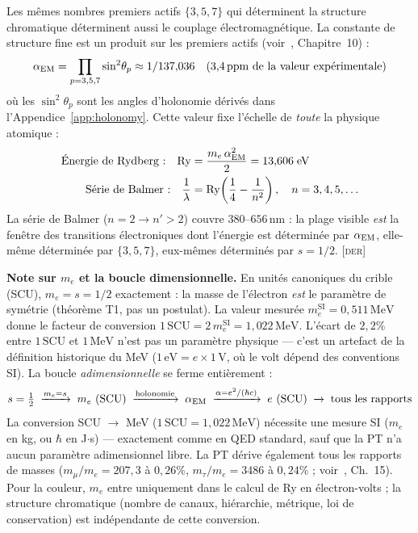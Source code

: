 \documentclass[12pt,a4paper]{article}
\begin{document}
\begin{derivedbox}
Les m\^emes nombres premiers actifs $\{3, 5, 7\}$ qui d\'eterminent la
structure chromatique d\'eterminent aussi le couplage
\'electromagn\'etique. La constante de structure fine est un produit
sur les premiers actifs (voir~\cite{senez2026math}, Chapitre~10) :
\begin{equation}
  \alpha_{\mathrm{EM}} = \prod_{p=3,5,7} \sin^2\!\theta_p
  \approx 1/137{,}036
  \quad\text{(3{,}4\,ppm de la valeur exp\'erimentale)}
  \label{eq:alpha}
\end{equation}
o\`u les $\sin^2\!\theta_p$ sont les angles d'holonomie d\'eriv\'es
dans l'Appendice~\ref{app:holonomy}. Cette valeur fixe l'\'echelle de
\emph{toute} la physique atomique :
\begin{align}
  \text{\'Energie de Rydberg :} \quad
  \mathrm{Ry} &= \frac{m_e\,\alpha_{\mathrm{EM}}^2}{2} = 13{,}606\;\mathrm{eV}
  \label{eq:rydberg} \\
  \text{S\'erie de Balmer :} \quad
  \frac{1}{\lambda} &= \mathrm{Ry}\!\left(\frac{1}{4} - \frac{1}{n^2}\right),
  \quad n = 3, 4, 5, \ldots
  \label{eq:balmer}
\end{align}
La s\'erie de Balmer ($n = 2 \to n' > 2$) couvre $380$--$656\,\mathrm{nm}$ :
la plage visible \emph{est} la fen\^etre des transitions \'electroniques
dont l'\'energie est d\'etermin\'ee par $\alpha_{\mathrm{EM}}$, elle-m\^eme
d\'etermin\'ee par $\{3, 5, 7\}$, eux-m\^emes d\'etermin\'es par
$s = 1/2$. \textsc{[der]}

\medskip\noindent
\textbf{Note sur $m_e$ et la boucle dimensionnelle.}\quad
En unit\'es canoniques du crible (SCU), $m_e = s = 1/2$ exactement :
la masse de l'\'electron \emph{est} le param\`etre de sym\'etrie
(th\'eor\`eme T1, pas un postulat). La valeur mesur\'ee
$m_e^{\mathrm{SI}} = 0{,}511\,\mathrm{MeV}$ donne le facteur de
conversion $1\,\mathrm{SCU} = 2\,m_e^{\mathrm{SI}} = 1{,}022\,\mathrm{MeV}$.
L'\'ecart de $2{,}2\%$ entre $1\,\mathrm{SCU}$ et $1\,\mathrm{MeV}$
n'est pas un param\`etre physique --- c'est un artefact de la
d\'efinition historique du MeV
($1\,\mathrm{eV} = e \times 1\,\mathrm{V}$, o\`u le volt d\'epend
des conventions SI). La boucle \emph{adimensionnelle} se ferme enti\`erement :
\[
  s = \tfrac{1}{2}
  \;\xrightarrow{m_e = s}\;
  m_e \text{ (SCU)}
  \;\xrightarrow{\text{holonomie}}\;
  \alpha_{\mathrm{EM}}
  \;\xrightarrow{\alpha = e^2/(\hbar c)}\;
  e \text{ (SCU)}
  \;\xrightarrow{}\;
  \text{tous les rapports}
\]
La conversion SCU $\to$ MeV ($1\,\mathrm{SCU} = 1{,}022\,\mathrm{MeV}$)
n\'ecessite une mesure SI ($m_e$ en kg, ou $\hbar$ en J$\cdot$s) ---
exactement comme en QED standard, sauf que la PT n'a aucun param\`etre
adimensionnel libre.
La PT d\'erive \'egalement tous les rapports de masses
($m_\mu/m_e = 207{,}3$ \`a $0{,}26\%$,
$m_\tau/m_e = 3486$ \`a $0{,}24\%$ ;
voir~\cite{senez2026math}, Ch.~15). Pour la couleur,
$m_e$ entre uniquement dans le calcul de Ry en \'electron-volts ;
la structure chromatique (nombre de canaux, hi\'erarchie,
m\'etrique, loi de conservation) est ind\'ependante de cette
conversion.
\end{derivedbox}
\end{document}
